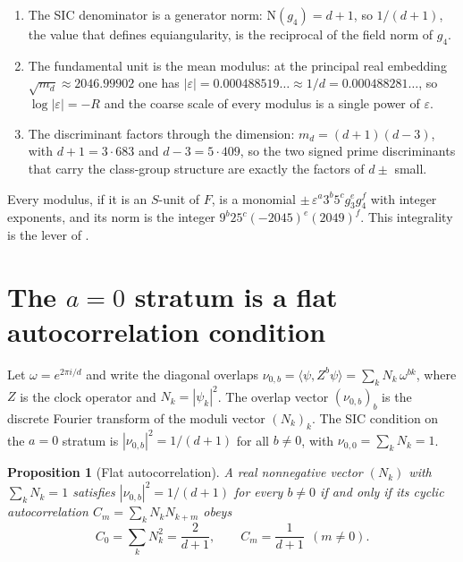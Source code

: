 \documentclass[12pt,a4paper]{article}
\newtheorem{proposition}[theorem]{Proposition}
\newcommand{\Fd}{F}
\newcommand{\md}{m_d}
\newcommand{\Norm}{\mathrm{N}}
\begin{document}
\begin{enumerate}
\item The SIC denominator is a generator norm: $\Norm(g_4)=d+1$, so
$1/(d+1)$, the value that defines equiangularity, is the reciprocal of the field
norm of $g_4$.
\item The fundamental unit is the mean modulus: at the principal real embedding
$\sqrt{\md}\approx 2046.99902$ one has
$|\varepsilon| = 0.000488519\ldots \approx 1/d = 0.000488281\ldots$, so
$\log|\varepsilon| = -R$ and the coarse scale of every modulus is a single power
of $\varepsilon$.
\item The discriminant factors through the dimension:
$\md = (d+1)(d-3)$, with $d+1=3\cdot 683$ and $d-3 = 5\cdot 409$, so the two
signed prime discriminants that carry the class-group structure are exactly the
factors of $d\pm$ small.
\end{enumerate}

Every modulus, if it is an $S$-unit of $\Fd$, is a monomial
$\pm\,\varepsilon^{a}3^{b}5^{c}g_3^{e}g_4^{f}$ with integer exponents, and its
norm is the integer $9^{b}25^{c}(-2045)^{e}(2049)^{f}$. This integrality is the
lever of .

\section{The $a=0$ stratum is a flat autocorrelation condition}
\label{sec:autocorr}

Let $\omega = e^{2\pi i/d}$ and write the diagonal overlaps
$\nu_{0,b} = \langle \psi, Z^b \psi\rangle = \sum_k N_k\,\omega^{bk}$, where
$Z$ is the clock operator and $N_k=|\psi_k|^2$. The overlap vector
$(\nu_{0,b})_b$ is the discrete Fourier transform of the moduli vector
$(N_k)_k$. The SIC condition on the $a=0$ stratum is
$|\nu_{0,b}|^2 = 1/(d+1)$ for all $b\neq 0$, with $\nu_{0,0}=\sum_k N_k = 1$.

\begin{proposition}[Flat autocorrelation]
\label{prop:autocorr}
A real nonnegative vector $(N_k)$ with $\sum_k N_k = 1$ satisfies
$|\nu_{0,b}|^2 = 1/(d+1)$ for every $b\neq 0$ if and only if its cyclic
autocorrelation $C_m = \sum_k N_k N_{k+m}$ obeys
\[
C_0 = \sum_k N_k^2 = \frac{2}{d+1},
\qquad
C_m = \frac{1}{d+1}\ \ (m\neq 0).
\]
\end{proposition}
\end{document}
